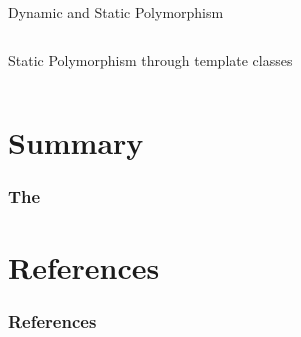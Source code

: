 \documentclass[9pt]{beamer}
\begin{document}
\begin{frame}
\begin{block}{Dynamic and Static Polymorphism}
\begin{columns}[t]
    \begin{column}{.45\textwidth}
       \begin{block}{Static Polymorphism through template classes}
          \begin{center}
          \end{center}
      \end{block}
    \end{column}

  \end{columns}
  
\end{block}
\end{frame}

\section{Summary}
\begin{frame}
  \frametitle{The \secname}
\end{frame}

\section{References}
\scriptsize
\begin{frame}
  \frametitle{References}
   
  
\end{frame}
\end{document}
